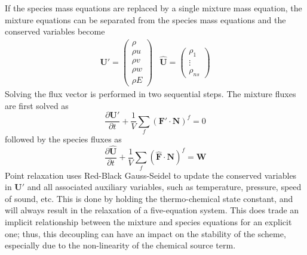 If the species mass equations are replaced by a single mixture mass equation,
the mixture equations can be separated from the species mass
equations and the conserved variables become
\begin{equation}
	\begin{matrix}
		\mathbf{U}'=\begin{pmatrix}
			\rho \\
			\rho u \\
			\rho v \\
			\rho w \\
			\rho E
		\end{pmatrix} &
		\mathbf{\hat{U}}=\begin{pmatrix}
			\rho_1 \\
			\vdots \\
			\rho_{ns}
		\end{pmatrix}
	\end{matrix}
  \label{dc-variables}
\end{equation}
Solving the flux vector is performed in two sequential steps.  The mixture
fluxes are first solved as
\begin{equation}
  \frac{\partial \mathbf{{U}'}}{\partial t} +
  \frac{1}{V}\sum\limits_{f}(\mathbf{F}'\cdot\mathbf{N})^f = 0
\end{equation}
followed by the species fluxes as
\begin{equation}
  \frac{\partial \mathbf{\hat{U}}}{\partial t} +
  \frac{1}{V}\sum\limits_{f}(\mathbf{\hat{F}}\cdot\mathbf{N})^f =
  \mathbf{\hat{W}}
\end{equation}
Point relaxation uses Red-Black Gauss-Seidel to update the conserved
variables in $\mathbf{U}'$ and all associated auxiliary variables, such as
temperature, pressure, speed of sound, etc.  This is done by holding the
thermo-chemical state constant, and will always result in the relaxation of a
five-equation system.  This does trade an implicit relationship between the mixture
and species equations for an explicit one; thus, this decoupling can have an
impact on the stability of the scheme, especially due to the non-linearity of
the chemical source term\cite{park}.
 
